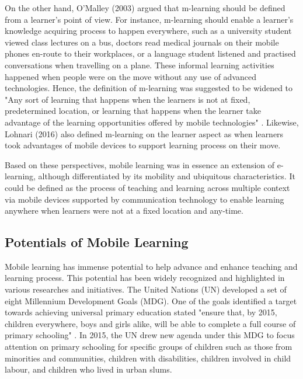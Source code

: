 On the other hand, O'Malley (2003) \cite{o2003guidelines} argued that m-learning should be defined from a learner's point of view. For instance, m-learning should enable a learner's knowledge acquiring process to happen everywhere, such as a university student viewed class lectures on a bus, doctors read medical journals on their mobile phones en-route to their workplaces, or a language student listened and practised conversations when travelling on a plane. These informal learning activities happened when people were on the move without any use of advanced technologies. Hence, the definition of m-learning was suggested to be widened to "Any sort of learning that happens when the learners is not at fixed, predetermined location, or learning that happens when the learner take advantage of the learning opportunities offered by mobile technologies" \cite[pp.7]{o2003guidelines}. Likewise, Lohnari (2016) \cite{lohnari2016mobile} also defined m-learning on the learner aspect as when learners took advantages of mobile devices to support learning process on their move. 

Based on these perspectives, mobile learning was in essence an extension of e-learning, although differentiated by its mobility and ubiquitous characteristics. It could be defined as the process of teaching and learning across multiple context via mobile devices supported by communication technology to enable learning anywhere when learners were not at a fixed location and any-time. 
	

\subsection{Potentials of Mobile Learning}

Mobile learning has immense potential to help advance and enhance teaching and learning process. This potential has been widely recognized and highlighted in various researches and initiatives.
The United Nations (UN) developed a set of eight Millennium Development Goals (MDG). One of the goals identified a target towards achieving universal primary education stated "ensure that, by 2015, children everywhere, boys and girls alike, will be able to complete a full course of primary schooling" \cite[pp. 24]{unreport}. In 2015, the UN drew new agenda under this MDG to focus attention on primary schooling for specific groups of children such as those from minorities and communities, children with disabilities, children involved in child labour, and children who lived in urban slums. 

